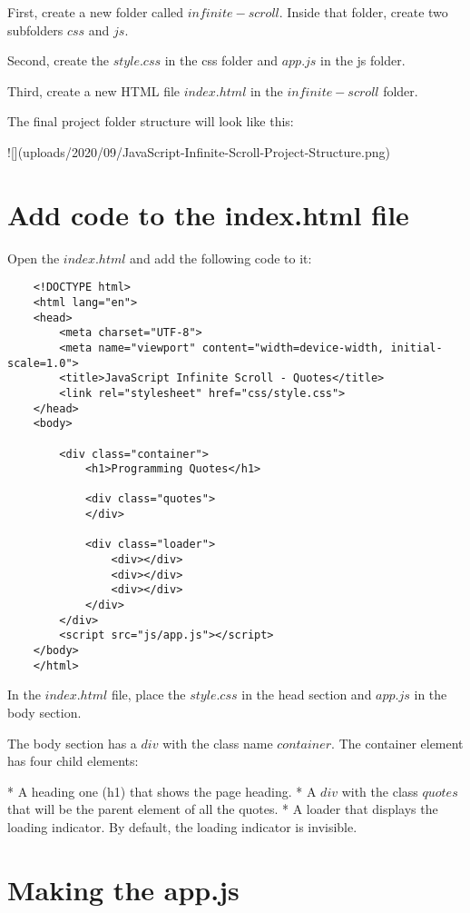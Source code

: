 \documentclass[11pt]{article}
\begin{document}
First, create a new folder called $infinite-scroll$. Inside that folder,
create two subfolders $css$ and $js$.

Second, create the $style.css$ in the css folder and $app.js$ in the js folder.

Third, create a new HTML file $index.html$ in the $infinite-scroll$ folder.

The final project folder structure will look like this:

![](uploads/2020/09/JavaScript-Infinite-Scroll-Project-Structure.png)

\section*{Add code to the index.html file}

Open the $index.html$ and add the following code to it:

\begin{lstlisting}
    <!DOCTYPE html>
    <html lang="en">
    <head>
        <meta charset="UTF-8">
        <meta name="viewport" content="width=device-width, initial-scale=1.0">
        <title>JavaScript Infinite Scroll - Quotes</title>
        <link rel="stylesheet" href="css/style.css">
    </head>
    <body>

        <div class="container">
            <h1>Programming Quotes</h1>

            <div class="quotes">
            </div>

            <div class="loader">
                <div></div>
                <div></div>
                <div></div>
            </div>
        </div>
        <script src="js/app.js"></script>
    </body>
    </html>
\end{lstlisting}

In the $index.html$ file, place the $style.css$ in the head section
and $app.js$ in the body section.

The body section has a $div$ with the class name $container$.
The container element has four child elements:

* A heading one (h1) that shows the page heading.
* A $div$ with the class $quotes$ that will be the parent element of
all the quotes.
* A loader that displays the loading indicator. By default,
the loading indicator is invisible.

\section*{Making the app.js}
\end{document}
